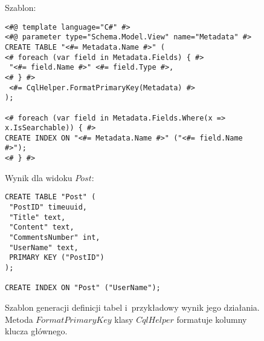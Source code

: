 \begin{figure}[!ht]
Szablon:

\begin{verbatim}
<#@ template language="C#" #>
<#@ parameter type="Schema.Model.View" name="Metadata" #>
CREATE TABLE "<#= Metadata.Name #>" (
<# foreach (var field in Metadata.Fields) { #>
 "<#= field.Name #>" <#= field.Type #>,
<# } #>
 <#= CqlHelper.FormatPrimaryKey(Metadata) #>
);

<# foreach (var field in Metadata.Fields.Where(x => x.IsSearchable)) { #>
CREATE INDEX ON "<#= Metadata.Name #>" ("<#= field.Name #>");
<# } #>
\end{verbatim}

Wynik dla widoku $Post$:

\begin{verbatim}
CREATE TABLE "Post" (
 "PostID" timeuuid,
 "Title" text,
 "Content" text,
 "CommentsNumber" int,
 "UserName" text,
 PRIMARY KEY ("PostID")
);

CREATE INDEX ON "Post" ("UserName");
\end{verbatim}

\caption{
 Szablon generacji definicji tabel i~przykładowy wynik jego działania.
 Metoda $FormatPrimaryKey$ klasy $CqlHelper$ formatuje kolumny klucza głównego.
}
\label{fig:single:template_table}
\end{figure}
